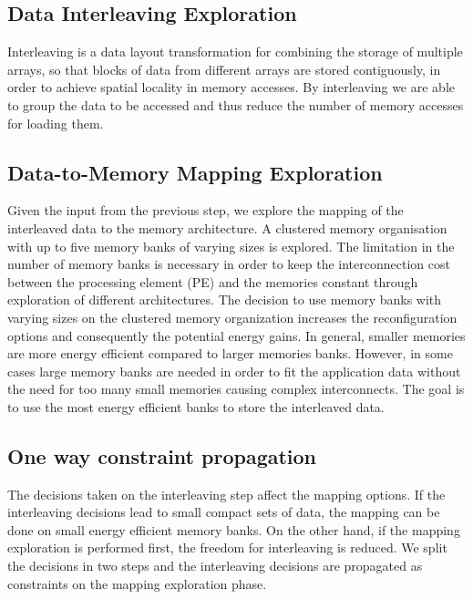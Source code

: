 \documentclass[prodmode,acmtodaes]{acmsmall}
\begin{document}
%
%

\subsection{Data Interleaving Exploration}
Interleaving is a data layout transformation for combining the storage of multiple arrays, so that blocks of data from different arrays are stored contiguously, in order to achieve spatial locality in memory accesses.
By interleaving we are able to group the data to be accessed and thus reduce the number of memory accesses for loading them.

\subsection{Data-to-Memory Mapping Exploration}

Given the input from the previous step, we explore the mapping of the interleaved data to the memory architecture.
A clustered memory organisation with up to five memory banks of varying sizes is explored. 
The limitation in the number of memory banks is necessary in order to keep the interconnection cost between the processing element (PE) and the memories constant through exploration of different architectures. 
The decision to use memory banks with varying sizes on the clustered memory organization increases the reconfiguration options and consequently the potential energy gains. 
In general, smaller memories are more energy efficient compared to larger memories banks. 
However, in some cases large memory banks are needed in order to fit the application data without the need for too many small memories causing complex interconnects. 
The goal is to use the most energy efficient banks to store the interleaved data.

\subsection{One way constraint propagation}

The decisions taken on the interleaving step affect the mapping options.
If the interleaving decisions lead to small compact sets of data, the mapping can be done on small energy efficient memory banks.
On the other hand, if the mapping exploration is performed first, the freedom for interleaving is reduced.
We split the decisions in two steps and the interleaving decisions are propagated as constraints on the mapping exploration phase. 
\end{document}

